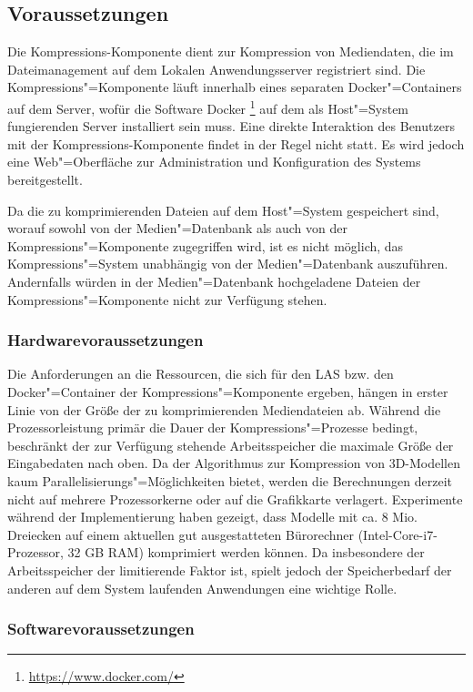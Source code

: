 \subsection{Voraussetzungen}

Die Kompressions-Komponente dient zur Kompression von Mediendaten, die im Dateimanagement auf dem Lokalen Anwendungsserver registriert sind. Die Kompressions"=Komponente läuft innerhalb eines separaten Docker"=Containers auf dem Server, wofür die Software Docker \footnote{\url{https://www.docker.com/}} auf dem als Host"=System fungierenden Server installiert sein muss. Eine direkte Interaktion des Benutzers mit der Kompressions-Komponente findet in der Regel nicht statt. Es wird jedoch eine Web"=Oberfläche zur Administration und Konfiguration des Systems bereitgestellt. 

Da die zu komprimierenden Dateien auf dem Host"=System gespeichert sind, worauf sowohl von der Medien"=Datenbank als auch von der Kompressions"=Komponente zugegriffen wird, ist es nicht möglich, das Kompressions"=System unabhängig von der Medien"=Datenbank auszuführen. Andernfalls würden in der Medien"=Datenbank hochgeladene Dateien der Kompressions"=Komponente nicht zur Verfügung stehen. 

\subsubsection{Hardwarevoraussetzungen}
\label{schlenke:chp:info:hardware}

Die Anforderungen an die Ressourcen, die sich für den LAS bzw. den Docker"=Container der Kompressions"=Komponente ergeben, hängen in erster Linie von der Größe der zu komprimierenden Mediendateien ab. Während die Prozessorleistung primär die Dauer der Kompressions"=Prozesse bedingt, beschränkt der zur Verfügung stehende Arbeitsspeicher die maximale Größe der Eingabedaten nach oben.
Da der Algorithmus zur Kompression von 3D-Modellen kaum Parallelisierungs"=Möglichkeiten bietet, werden die Berechnungen derzeit nicht auf mehrere Prozessorkerne oder auf die Grafikkarte verlagert. 
Experimente während der Implementierung haben gezeigt, dass Modelle mit ca. 8 Mio. Dreiecken auf einem aktuellen gut ausgestatteten Bürorechner (Intel-Core-i7-Prozessor, 32 GB RAM) komprimiert werden können. Da insbesondere der Arbeitsspeicher der limitierende Faktor ist, spielt jedoch der Speicherbedarf der anderen auf dem System laufenden Anwendungen eine wichtige Rolle.

\subsubsection{Softwarevoraussetzungen}

